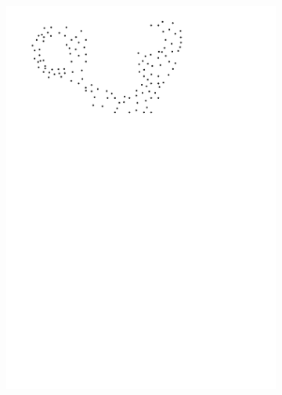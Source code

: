 \begin{figure}[h]
\begin{subfigure}[b]{0.22\linewidth}
    \includegraphics[page=2,width=\textwidth]{figs/idea.pdf}
  \end{subfigure}
  \quad
  \begin{subfigure}[b]{0.22\linewidth}
    \centering

\end{subfigure}
\end{figure}
